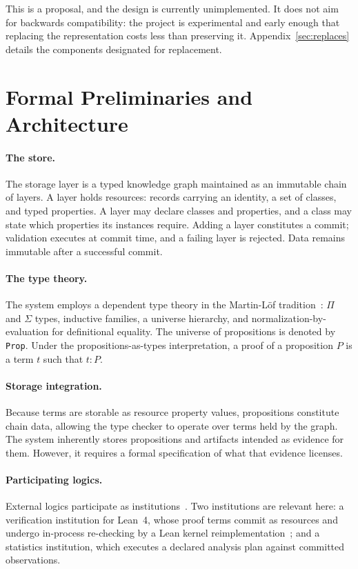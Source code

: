 \documentclass[manuscript,nonacm=true]{acmart}
\newcommand{\code}[1]{\texttt{\small #1}}
\newcommand{\Prop}{\code{Prop}}
\begin{document}
This is a proposal, and the design is currently unimplemented. It does not aim for backwards compatibility: the project is experimental and early enough that replacing the representation costs less than preserving it. Appendix~\ref{sec:replaces} details the components designated for replacement.

\section{Formal Preliminaries and Architecture}

\paragraph{The store.} The storage layer is a typed knowledge graph maintained as an immutable chain of layers. A layer holds resources: records carrying an identity, a set of classes, and typed properties. A layer may declare classes and properties, and a class may state which properties its instances require. Adding a layer constitutes a commit; validation executes at commit time, and a failing layer is rejected. Data remains immutable after a successful commit.

\paragraph{The type theory.} The system employs a dependent type theory in the Martin-L\"of tradition~\cite{mltt}: $\Pi$ and $\Sigma$ types, inductive families, a universe hierarchy, and normalization-by-evaluation for definitional equality. The universe of propositions is denoted by \Prop{}. Under the propositions-as-types interpretation, a proof of a proposition $P$ is a term $t$ such that $t : P$.

\paragraph{Storage integration.} Because terms are storable as resource property values, propositions constitute chain data, allowing the type checker to operate over terms held by the graph. The system inherently stores propositions and artifacts intended as evidence for them. However, it requires a formal specification of what that evidence licenses.

\paragraph{Participating logics.} External logics participate as institutions~\cite{gb92}. Two institutions are relevant here: a verification institution for Lean~4, whose proof terms commit as resources and undergo in-process re-checking by a Lean kernel reimplementation~\cite{nanoda}; and a statistics institution, which executes a declared analysis plan against committed observations.
\end{document}
